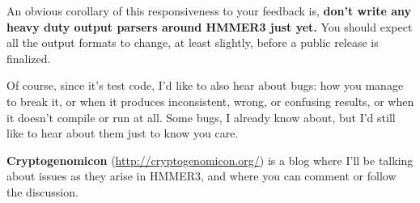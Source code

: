 \begin{sidebar}
An obvious corollary of this responsiveness to your feedback is,
\textbf{don't write any heavy duty output parsers around HMMER3 just
yet.} You should expect all the output formats to change, at least
slightly, before a public release is finalized.
\end{sidebar}

Of course, since it's test code, I'd like to also hear about bugs: how
you manage to break it, or when it produces inconsistent, wrong, or
confusing results, or when it doesn't compile or run at all.  Some
bugs, I already know about, but I'd still like to hear about them just
to know you care.

\textbf{Cryptogenomicon} (\url{http://cryptogenomicon.org/}) is a blog
where I'll be talking about issues as they arise in HMMER3, and where
you can comment or follow the discussion.





















  









